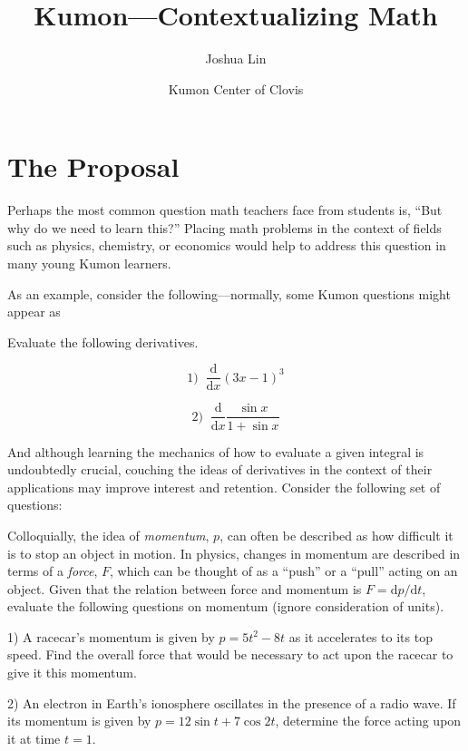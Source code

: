 \documentclass[fleqn]{article}
\title{Kumon---Contextualizing Math}
\author{Joshua Lin}
\date{Kumon Center of Clovis}
\begin{document}
\maketitle

\section{The Proposal}

Perhaps the most common question math teachers face from students is, ``But why do we need to learn this?'' Placing math problems in the context of fields such as physics, chemistry, or economics would help to address this question in many young Kumon learners. \bigskip

As an example, consider the following---normally, some Kumon questions might appear as \bigskip

\begin{tcolorbox}[width=\linewidth]

Evaluate the following derivatives.

\[ 1) \;\; \frac{\mathrm{d}}{\mathrm{d}x} (3x-1)^3 \]

\[ 2) \;\; \frac{\mathrm{d}}{\mathrm{d}x} \frac{\sin{x}}{1+\sin{x}} \] 

\end{tcolorbox} 
\bigskip

And although learning the mechanics of how to evaluate a given integral is undoubtedly crucial, couching the ideas of derivatives in the context of their applications may improve interest and retention. Consider the following set of questions: \bigskip

\begin{tcolorbox}[width=\linewidth]

Colloquially, the idea of \textit{momentum}, $p$, can often be described as how difficult it is to stop an object in motion. In physics, changes in momentum are described in terms of a \textit{force}, $F$, which can be thought of as a ``push'' or a ``pull'' acting on an object. Given that the relation between force and momentum is $F=\mathrm{d}p/\mathrm{d}t$, evaluate the following questions on momentum (ignore consideration of units). \bigskip 

1) A racecar's momentum is given by $p=5t^2 - 8t$ as it accelerates to its top speed. Find the overall force that would be necessary to act upon the racecar to give it this momentum. \bigskip

2) An electron in Earth's ionosphere oscillates in the presence of a radio wave. If its momentum is given by $p = 12\sin{t} + 7\cos{2t}$, determine the force acting upon it at time $t = 1$. 

\end{tcolorbox}
\bigskip
\end{document}
